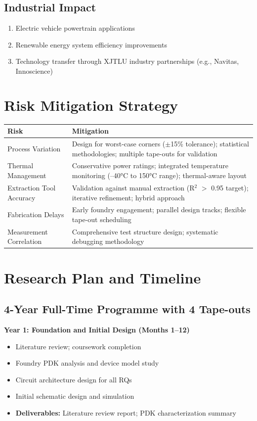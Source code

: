 \documentclass[12pt,a4paper]{article}
\begin{document}
\subsection{Industrial Impact}
\begin{enumerate}[leftmargin=*]
    \item Electric vehicle powertrain applications
    \item Renewable energy system efficiency improvements
    \item Technology transfer through XJTLU industry partnerships (e.g., Navitas, Innoscience)
\end{enumerate}

\section{Risk Mitigation Strategy}

\begin{longtable}{@{}p{3.5cm}p{10cm}@{}}
\toprule
\textbf{Risk} & \textbf{Mitigation} \\
\midrule
\endhead
Process Variation & Design for worst-case corners ($\pm$15\% tolerance); statistical methodologies; multiple tape-outs for validation \\
\addlinespace
Thermal Management & Conservative power ratings; integrated temperature monitoring (--40°C to 150°C range); thermal-aware layout \\
\addlinespace
Extraction Tool Accuracy & Validation against manual extraction (R$^2$ $>$ 0.95 target); iterative refinement; hybrid approach \\
\addlinespace
Fabrication Delays & Early foundry engagement; parallel design tracks; flexible tape-out scheduling \\
\addlinespace
Measurement Correlation & Comprehensive test structure design; systematic debugging methodology \\
\bottomrule
\end{longtable}

\section{Research Plan and Timeline}

\subsection{4-Year Full-Time Programme with 4 Tape-outs}

\textbf{Year 1: Foundation and Initial Design (Months 1--12)}
\begin{itemize}[leftmargin=*]
    \item Literature review; coursework completion
    \item Foundry PDK analysis and device model study
    \item Circuit architecture design for all RQs
    \item Initial schematic design and simulation
    \item \textbf{Deliverables:} Literature review report; PDK characterization summary
\end{itemize}
\end{document}
